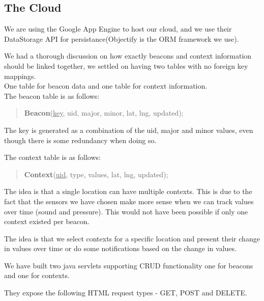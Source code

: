 \subsection{The Cloud}
We are using the Google App Engine to host our cloud, and we use their DataStorage API for persistance(Objectify is the ORM framework we use).

We had a thorough discussion on how exactly beacons and context information should be linked together, we settled on having two tables with no foreign key mappings.\\
One table for beacon data and one table for context information.\\

The beacon table is as follows:
\begin{quotation}
\textbf{Beacon}(\underline{key}, uid, major, minor, lat, lng, updated);
\end{quotation}
The key is generated as a combination of the uid, major and minor values, even though there is some redundancy when doing so.

The context table is as follows:
\begin{quotation}
\textbf{Context}(\underline{uid}, type, values, lat, lng, updated);
\end{quotation}
The idea is that a single location can have multiple contexts. This is due to the fact that the sensors we have chosen make more sense when we can track values over time (sound and pressure).
This would not have been possible if only one context existed per beacon.

The idea is that we select contexts for a specific location and present their change in values over time or do some notifications based on the change in values.




We have built two java servlets supporting CRUD functionality one for beacons and one for contexts.

They expose the following HTML request types - GET, POST and DELETE.

